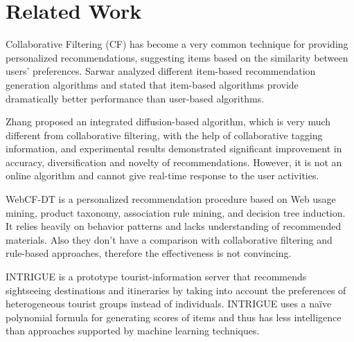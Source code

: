 \section{Related Work}\label{sec:related}

Collaborative Filtering (CF) \cite{Goldberg92} has become a very common technique 
  for providing personalized recommendations, suggesting items based on the similarity 
  between users' preferences.
Sarwar \etal\cite{Sarwar01} analyzed different item-based recommendation generation algorithms 
  and stated that item-based algorithms provide dramatically better performance than 
  user-based algorithms.

Zhang \etal\cite{Zhang10} proposed an integrated diffusion-based algorithm, which is very much 
  different from collaborative filtering, with the help of collaborative tagging 
  information, and experimental results demonstrated significant improvement in accuracy, 
  diversification and novelty of recommendations. 
However, it is not an online algorithm and cannot give real-time response to the user activities.

WebCF-DT \cite{Kim02} is a personalized recommendation procedure based on Web usage mining, 
  product taxonomy, association rule mining, and decision tree induction. 
It relies heavily on behavior patterns and lacks understanding of recommended materials. 
Also they don't have a comparison with collaborative filtering and rule-based approaches, 
  therefore the effectiveness is not convincing.

INTRIGUE \cite{Ardissono03} is a prototype tourist-information server that recommends 
  sightseeing destinations and itineraries by taking into account the preferences of 
  heterogeneous tourist groups instead of individuals.
INTRIGUE uses a na\"ive polynomial formula for generating scores of items and thus has less 
  intelligence than approaches supported by machine learning techniques.
